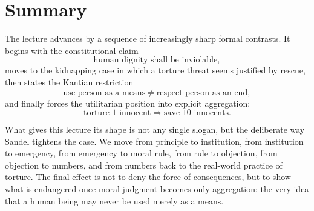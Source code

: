 \section{Summary}

The lecture advances by a sequence of increasingly sharp formal contrasts. It begins with the constitutional claim
\begin{equation}
\text{human dignity shall be inviolable},
\end{equation}
moves to the kidnapping case in which a torture threat seems justified by rescue, then states the Kantian restriction
\begin{equation}
\text{use person as a means}
\neq
\text{respect person as an end},
\end{equation}
and finally forces the utilitarian position into explicit aggregation:
\begin{equation}
\text{torture }1\text{ innocent}
\Longrightarrow
\text{save }10\text{ innocents}.
\end{equation}

What gives this lecture its shape is not any single slogan, but the deliberate way Sandel tightens the case. We move from principle to institution, from institution to emergency, from emergency to moral rule, from rule to objection, from objection to numbers, and from numbers back to the real-world practice of torture. The final effect is not to deny the force of consequences, but to show what is endangered once moral judgment becomes only aggregation: the very idea that a human being may never be used merely as a means.